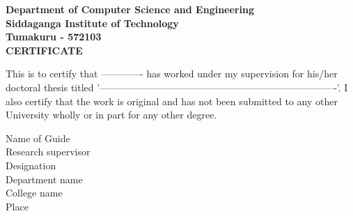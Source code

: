 \begin{center}
\bfseries
\large{Department of Computer Science and Engineering\\
Siddaganga Institute of Technology \\
Tumakuru - 572103} \\
\vspace{1.5in}
\LARGE{CERTIFICATE} \\
\end{center}
\vspace{0.5in}
\normalsize{
This is to certify that ------------- has worked under my supervision for his/her doctoral thesis titled '-------------------------------------------------------------------------'. I also certify that the work is original and has not been submitted to any other University wholly or in part for any other degree.} \\
\vspace{0.5in}
\begin{flushleft}
\normalsize{Name of Guide} \\
Research supervisor \\
Designation \\
Department name  \\
College name \\
Place \\
\end{flushleft}


